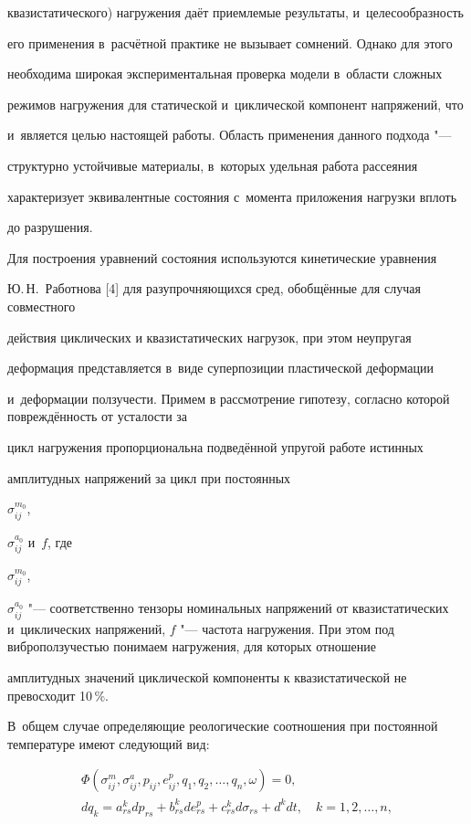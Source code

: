 квазистатического) нагружения даёт приемлемые результаты, и~целесообразность 

его применения в~расчётной практике не вызывает сомнений. Однако для этого 

необходима широкая экспериментальная проверка модели в~области сложных 

режимов нагружения для статической и~циклической компонент напряжений, что 

и~является целью настоящей работы. Область применения данного подхода "--- 

структурно устойчивые материалы, в~которых удельная работа рассеяния 

характеризует эквивалентные состояния с~момента приложения нагрузки вплоть 

до разрушения. 



Для построения уравнений состояния используются кинетические уравнения 

Ю.\,Н.~Работнова [4] для разупрочняющихся сред, обобщённые для случая совместного 

действия циклических и квазистатических нагрузок, при этом неупругая 

деформация представляется в~виде суперпозиции пластической деформации 

и~деформации ползучести. Примем в рассмотрение гипотезу, согласно которой повреждённость от усталости за 

цикл нагружения пропорциональна подведённой упругой работе истинных 

амплитудных напряжений за цикл при постоянных 

$\sigma _{ij}^{m_0 } $, 

$\sigma _{ij}^{a_0 } $ и~$f$, где 

$\sigma _{ij}^{m_0 } $, 

$\sigma _{ij}^{a_0 } $ "--- соответственно тензоры номинальных напряжений от квазистатических и~циклических напряжений, $f$ "--- частота нагружения. При этом под виброползучестью понимаем нагружения, для которых отношение 

амплитудных значений циклической компоненты к квазистатической не превосходит 10\,{\%}. 

В~общем случае определяющие реологические соотношения при постоянной температуре имеют следующий вид:

\begin{gather}  

\label{kichaev:eq1} 

\Phi ( \sigma _{ij}^m, \sigma _{ij}^a, p_{ij}, e_{ij}^p, q_1, q_2, \dots, q_n , \omega )=0,

\\

\label{kichaev:eq2}

dq_k =a_{rs}^k dp_{rs} +b_{rs}^k de_{rs}^p +c_{rs}^k d\sigma _{rs} +d^k dt, \quad k=1, 2, \dots, n,

\end{gather}

